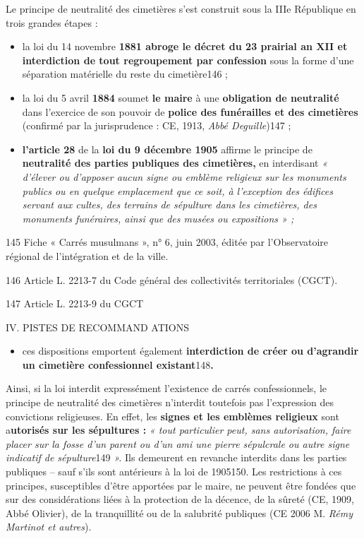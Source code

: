 Le principe de neutralité des cimetières s'est construit sous la IIIe
République en trois grandes étapes :


\begin{itemize}
\item
  la loi du 14 novembre \textbf{1881 abroge le décret du 23 prairial an
  XII et interdiction de tout regroupement par confession} sous la forme
  d'une séparation matérielle du reste du cimetière146 ;
\item
  la loi du 5 avril \textbf{1884} soumet \textbf{le maire} à une
  \textbf{obligation de neutralité} dans l'exercice de son pouvoir de
  \textbf{police des funérailles et des cimetières} (confirmé par la
  jurisprudence : CE, 1913, \emph{Abbé Deguille})147 ;
\item
  
  \textbf{l'article 28} de la \textbf{loi du 9 décembre 1905} affirme le
  principe de \textbf{neutralité des parties publiques des cimetières,}
  en interdisant \emph{« d'élever ou d'apposer aucun signe ou emblème
  religieux sur les monuments publics ou en quelque emplacement que ce
  soit, à l'exception des édifices servant aux cultes, des terrains de
  sépulture dans les cimetières, des monuments funéraires, ainsi que des
  musées ou expositions » ;}
  
\end{itemize}


145 Fiche « Carrés musulmans », n° 6, juin 2003, éditée par
l'Observatoire régional de l'intégration et de la ville.

146 Article L. 2213-7 du Code général des collectivités territoriales
(CGCT).

147 Article L. 2213-9 du CGCT

IV. PISTES DE RECOMMAND ATIONS


\begin{itemize}
\item
  ces dispositions emportent également \textbf{interdiction de créer ou
  d'agrandir un cimetière confessionnel existant}148\textbf{.}
\end{itemize}


Ainsi, si la loi interdit expressément l'existence de carrés
confessionnels, le principe de neutralité des cimetières n'interdit
toutefois pas l'expression des convictions religieuses. En effet, les
\textbf{signes et les emblèmes religieux} sont a\textbf{utorisés sur les
sépultures :} \emph{« tout particulier peut, sans autorisation, faire
placer sur la fosse d'un parent ou d'un ami une pierre sépulcrale ou
autre signe indicatif de sépulture}149 \emph{».} Ils demeurent en
revanche interdits dans les parties publiques -- sauf s'ils sont
antérieurs à la loi de 1905150. Les restrictions à ces principes,
susceptibles d'être apportées par le maire, ne peuvent être fondées que
sur des considérations liées à la protection de la décence, de la sûreté
(CE, 1909, Abbé Olivier), de la tranquillité ou de la salubrité
publiques (CE 2006 M. \emph{Rémy Martinot et autres}).

